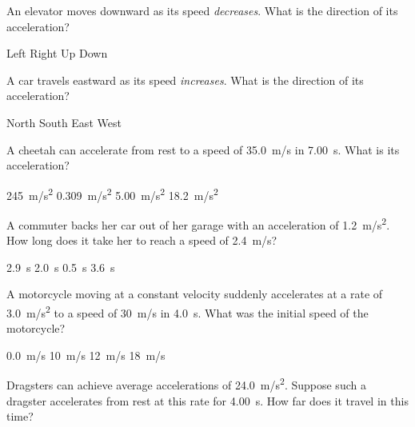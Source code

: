 \documentclass[../main-physics-problems.tex]{subfiles}
\begin{document}
\begin{questions}
\question %
An elevator moves downward as its speed \textit{decreases}. What is the direction of its acceleration?

\begin{choices}
\choice Left
\choice Right 
\correctchoice Up
\choice Down
\end{choices}

\question %
A car travels eastward as its speed \textit{increases}. What is the direction of its acceleration?

\begin{choices}
\choice North
\choice South 
\correctchoice East
\choice West
\end{choices}


\question %
A cheetah can accelerate from rest to a speed of \SI{35.0}{m/s} in \SI{7.00}{s}. What is its acceleration?

\begin{choices}
\choice \SI{245}{m/s^2}
\choice \SI{0.309}{m/s^2}
\CorrectChoice \SI{5.00}{m/s^2}
\choice \SI{18.2}{m/s^2}
\end{choices}

\question %
A commuter backs her car out of her garage with an acceleration of \SI{1.2}{m/s^2}. How long does it take her to reach a speed of \SI{2.4}{m/s}?

\begin{choices}
\choice \SI{2.9}{s}
\correctchoice \SI{2.0}{s}
\choice \SI{0.5}{s}
\choice \SI{3.6}{s}
\end{choices}



\question %

A motorcycle moving at a constant velocity suddenly accelerates at a rate of \SI{3.0}{m/s^2} to a speed of \SI{30}{m/s} in \SI{4.0}{s}. What was the initial speed of the motorcycle?

\begin{choices}
\choice \SI{0.0}{m/s}
\choice \SI{10}{m/s}
\choice \SI{12}{m/s}
\CorrectChoice \SI{18}{m/s}
\end{choices}

\question %
Dragsters can achieve average accelerations of \SI{24.0}{m/s^2}. Suppose such a dragster accelerates from rest at this rate for \SI{4.00}{s}. How far does it travel in this time?


\end{questions}
\end{document}
